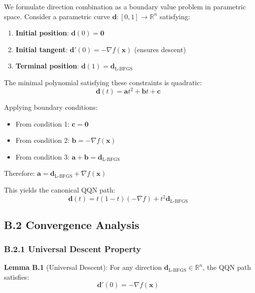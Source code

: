 We formulate direction combination as a boundary value problem in parametric space. Consider a parametric curve \(\mathbf{d}: [0,1] \rightarrow \mathbb{R}^n\) satisfying:

\begin{enumerate}
\def\labelenumi{\arabic{enumi}.}
\tightlist
\item
  \textbf{Initial position}: \(\mathbf{d}(0) = \mathbf{0}\)
\item
  \textbf{Initial tangent}: \(\mathbf{d}'(0) = -\nabla f(\mathbf{x})\) (ensures descent)
\item
  \textbf{Terminal position}: \(\mathbf{d}(1) = \mathbf{d}_{\text{L-BFGS}}\)
\end{enumerate}

The minimal polynomial satisfying these constraints is quadratic:
\[\mathbf{d}(t) = \mathbf{a}t^2 + \mathbf{b}t + \mathbf{c}\]

Applying boundary conditions:

\begin{itemize}
\tightlist
\item
  From condition 1: \(\mathbf{c} = \mathbf{0}\)
\item
  From condition 2: \(\mathbf{b} = -\nabla f(\mathbf{x})\)
\item
  From condition 3: \(\mathbf{a} + \mathbf{b} = \mathbf{d}_{\text{L-BFGS}}\)
\end{itemize}

Therefore: \(\mathbf{a} = \mathbf{d}_{\text{L-BFGS}} + \nabla f(\mathbf{x})\)

This yields the canonical QQN path:
\[\mathbf{d}(t) = t(1-t)(-\nabla f) + t^2 \mathbf{d}_{\text{L-BFGS}}\]

\hypertarget{b.2-convergence-analysis}{%
\subsection{B.2 Convergence Analysis}\label{b.2-convergence-analysis}}

\hypertarget{b.2.1-universal-descent-property}{%
\subsubsection{B.2.1 Universal Descent Property}\label{b.2.1-universal-descent-property}}

\textbf{Lemma B.1} (Universal Descent): For any direction \(\mathbf{d}_{\text{L-BFGS}} \in \mathbb{R}^n\), the QQN path satisfies:
\[\mathbf{d}'(0) = -\nabla f(\mathbf{x})\]

